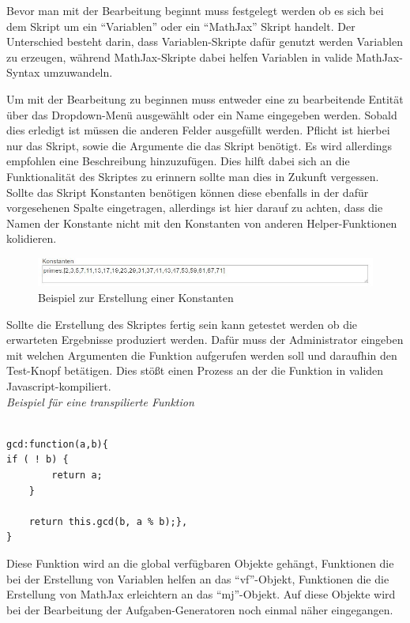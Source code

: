 Bevor man mit der Bearbeitung beginnt muss festgelegt werden ob es sich bei dem Skript um ein ``Variablen'' oder ein ``MathJax'' Skript handelt. Der Unterschied besteht darin, dass Variablen-Skripte dafür genutzt werden Variablen zu erzeugen, während MathJax-Skripte dabei helfen Variablen in valide MathJax-Syntax umzuwandeln.

Um mit der Bearbeitung zu beginnen muss entweder eine zu bearbeitende Entität über das Dropdown-Menü ausgewählt oder ein Name eingegeben werden. Sobald dies erledigt ist müssen die anderen Felder ausgefüllt werden. Pflicht ist hierbei nur das Skript, sowie die Argumente die das Skript benötigt. Es wird allerdings empfohlen eine Beschreibung hinzuzufügen. Dies hilft dabei sich an die Funktionalität des Skriptes zu erinnern sollte man dies in Zukunft vergessen. \\

Sollte das Skript Konstanten benötigen können diese ebenfalls in der dafür vorgesehenen Spalte eingetragen, allerdings ist hier darauf zu achten, dass die Namen der Konstante nicht mit den Konstanten von anderen Helper-Funktionen kolidieren.

\begin{figure}[htp]     %
\centering
\includegraphics[width=1\textwidth]{bilder/ConstantExample} 
\caption[Beispiel zur Erstellung einer Konstanten]{Beispiel zur Erstellung einer Konstanten}
\end{figure} 

Sollte die Erstellung des Skriptes fertig sein kann getestet werden ob die erwarteten Ergebnisse produziert werden. Dafür muss der Administrator eingeben mit welchen Argumenten die Funktion aufgerufen werden soll und daraufhin den Test-Knopf betätigen. Dies stößt einen Prozess an der die Funktion in validen Javascript-kompiliert. \\

\emph{Beispiel für eine transpilierte Funktion}
\begin{lstlisting}

gcd:function(a,b){
if ( ! b) {
        return a;
    }

    return this.gcd(b, a % b);}, 
}
\end{lstlisting}

Diese Funktion wird an die global verfügbaren Objekte gehängt, Funktionen die bei der Erstellung von Variablen helfen an das ``vf''-Objekt, Funktionen die die Erstellung von MathJax erleichtern an das ``mj''-Objekt. Auf diese Objekte wird bei der Bearbeitung der Aufgaben-Generatoren noch einmal näher eingegangen. \\

